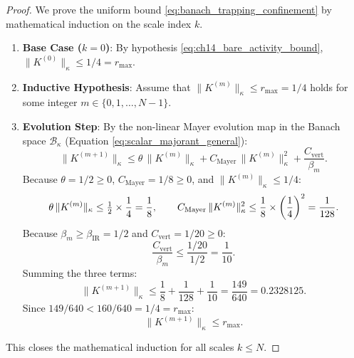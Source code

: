 \begin{proof}
We prove the uniform bound \eqref{eq:banach_trapping_confinement} by mathematical induction on the scale index $k$.
\begin{enumerate}[label=\textbf{Step \arabic*:}, leftmargin=*]
    \item \textbf{Base Case ($k = 0$)}: By hypothesis \eqref{eq:ch14_bare_activity_bound}, $\|K^{(0)}\|_\kappa \le 1/4 = r_{\max}$.
    \item \textbf{Inductive Hypothesis}: Assume that $\|K^{(m)}\|_\kappa \le r_{\max} = 1/4$ holds for some integer $m \in \{0, 1, \dots, N-1\}$.
    \item \textbf{Evolution Step}: By the non-linear Mayer evolution map in the Banach space $\mathcal{B}_\kappa$ (Equation \eqref{eq:scalar_majorant_general}):
    \begin{equation}
    \|K^{(m+1)}\|_\kappa \le \theta \, \|K^{(m)}\|_\kappa + C_{\mathrm{Mayer}} \, \|K^{(m)}\|_\kappa^2 + \frac{C_{\mathrm{vert}}}{\beta_m}.
    \end{equation}
    Because $\theta = 1/2 \ge 0$, $C_{\mathrm{Mayer}} = 1/8 \ge 0$, and $\|K^{(m)}\|_\kappa \le 1/4$:
    \begin{equation}
    \theta \, \|K^{(m)}\|_\kappa \le \tfrac{1}{2} \times \frac{1}{4} = \frac{1}{8}, \qquad C_{\mathrm{Mayer}} \, \|K^{(m)}\|_\kappa^2 \le \frac{1}{8} \times \left(\frac{1}{4}\right)^2 = \frac{1}{128}.
    \end{equation}
    Because $\beta_m \ge \beta_{\mathrm{IR}} = 1/2$ and $C_{\mathrm{vert}} = 1/20 \ge 0$:
    \begin{equation}
    \frac{C_{\mathrm{vert}}}{\beta_m} \le \frac{1/20}{1/2} = \frac{1}{10}.
    \end{equation}
    Summing the three terms:
    \begin{equation}
    \|K^{(m+1)}\|_\kappa \le \frac{1}{8} + \frac{1}{128} + \frac{1}{10} = \frac{149}{640} = 0.2328125.
    \end{equation}
    Since $149/640 < 160/640 = 1/4 = r_{\max}$:
    \begin{equation}
    \|K^{(m+1)}\|_\kappa \le r_{\max}.
    \end{equation}
\end{enumerate}
This closes the mathematical induction for all scales $k \le N$.


\end{proof}

